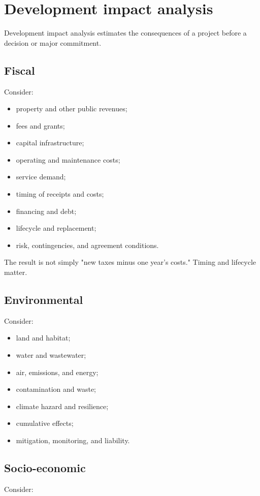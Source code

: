 \documentclass[11pt,letterpaper,oneside,openany]{book}
\begin{document}
\section[Development impact analysis]{Development impact analysis}
Development impact analysis estimates the consequences of a project before a decision or major commitment.


\subsection[Fiscal]{Fiscal}
Consider:


\begin{itemize}
\item property and other public revenues;
\item fees and grants;
\item capital infrastructure;
\item operating and maintenance costs;
\item service demand;
\item timing of receipts and costs;
\item financing and debt;
\item lifecycle and replacement;
\item risk, contingencies, and agreement conditions.
\end{itemize}


The result is not simply "new taxes minus one year's costs." Timing and lifecycle matter.


\subsection[Environmental]{Environmental}
Consider:


\begin{itemize}
\item land and habitat;
\item water and wastewater;
\item air, emissions, and energy;
\item contamination and waste;
\item climate hazard and resilience;
\item cumulative effects;
\item mitigation, monitoring, and liability.
\end{itemize}


\subsection[Socio-economic]{Socio-economic}
Consider:
\end{document}
